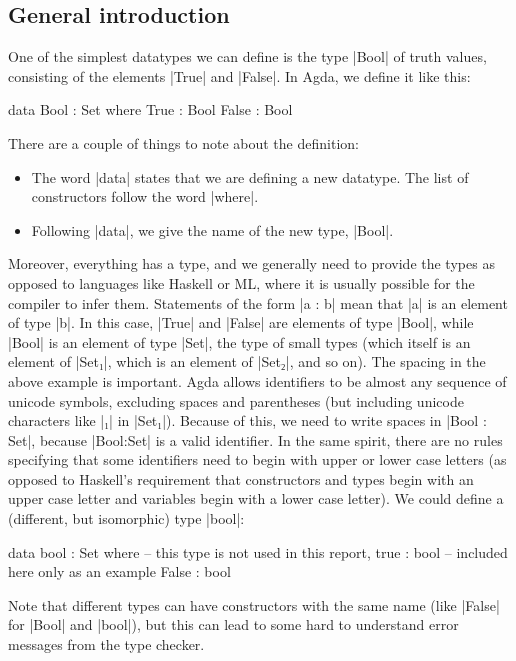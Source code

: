 \subsection{General introduction}
\label{General-intro}
One of the simplest datatypes we can define is the type |Bool| of truth values, consisting of the elements |True| and |False|. In Agda, we define it like this:
\begin{code}
data Bool : Set where
  True   : Bool
  False  : Bool
\end{code}
There are a couple of things to note about the definition:
\begin{itemize}
\item The word |data| states that we are defining a new datatype. The list of constructors follow the word |where|. 
\item Following |data|, we give the name of the new type, |Bool|.
\end{itemize}
Moreover, everything has a type, and we generally need to provide the types as opposed to languages like Haskell or ML, where it is usually possible for the compiler to infer them. Statements of the form |a : b| mean that |a| is an element of type |b|. In this case, |True| and |False| are elements of type |Bool|, while |Bool| is an element of type |Set|, the type of small types (which itself is an element of |Set₁|, which is an element of |Set₂|, and so on).
The spacing in the above example is important. Agda allows identifiers to be almost any sequence of unicode symbols, excluding spaces and parentheses (but including unicode characters like |₁| in |Set₁|). Because of this, we need to write spaces in |Bool : Set|, because |Bool:Set| is a valid identifier. In the same spirit, there are no rules specifying that some identifiers need to begin with upper or lower case letters (as opposed to Haskell's requirement that constructors and types begin with an upper case letter and variables begin with a lower case letter). We could define a (different, but isomorphic) type |bool|:
\begin{code}
data bool : Set where   -- this type is not used in this report,
  true   : bool         -- included here only as an example
  False  : bool
\end{code}
Note that different types can have constructors with the same name (like |False| for |Bool| and |bool|), but this can lead to some hard to understand error messages from the type checker.

